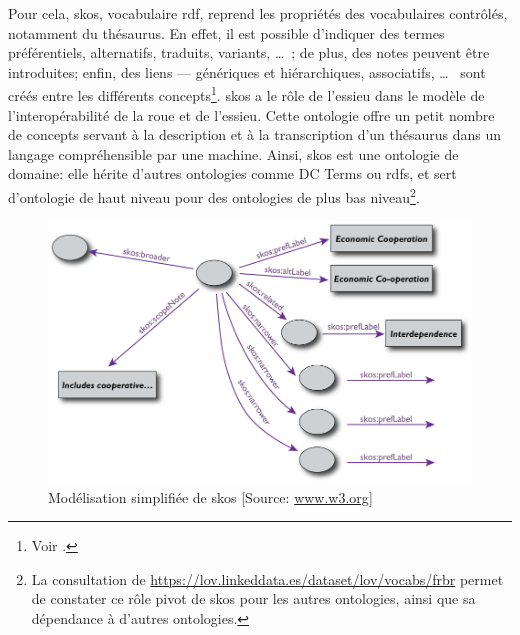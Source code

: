 Pour cela, \ac{skos}, vocabulaire \ac{rdf}, reprend les propriétés des vocabulaires contrôlés, notamment du thésaurus. En effet, il est possible d'indiquer des termes préférentiels, alternatifs, traduits, variants, \dots~; de plus, des notes peuvent être introduites; enfin, des liens --- génériques et hiérarchiques, associatifs, \dots~ sont créés entre les différents concepts\footnote{Voir .}. \ac{skos} a le rôle de l'essieu dans le modèle de l'interopérabilité de la roue et de l'essieu. Cette ontologie offre un petit nombre de concepts servant à la description et à la transcription d'un thésaurus dans un langage compréhensible par une machine. Ainsi, \ac{skos} est une ontologie de domaine: elle hérite d'autres ontologies comme DC Terms ou \ac{rdfs}, et sert d'ontologie de haut niveau pour des ontologies de plus bas niveau\footnote{La consultation de \url{https://lov.linkeddata.es/dataset/lov/vocabs/frbr} permet de constater ce rôle pivot de \ac{skos} pour les autres ontologies, ainsi que sa dépendance à d'autres ontologies.}.\\

\begin{figure}[!h]
	\centering
	\includegraphics[width=13cm]{images/SKOS_simpleThesaurus.png}
	\caption[Modélisation simplifiée de \ac{skos}]{Modélisation simplifiée de \ac{skos} [Source: \href{https://www.w3.org/Consortium/Offices/Presentations/RDFTutorial/figures/SKOS_simpleThesaurus.png}{www.w3.org}]}
	\label{skos_modelisation}
\end{figure}
\medskip

